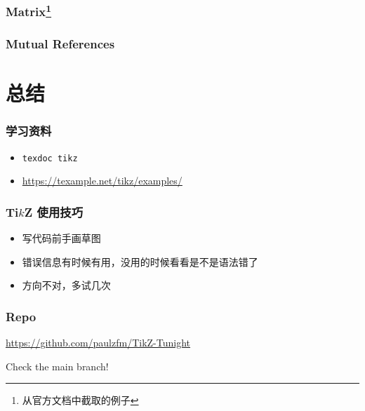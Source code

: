\documentclass[usenames,xcolor=svgnames,11pt,sans]{beamer}
\newcommand{\key}[1]{{\color{theme} #1}}
\let\t\texttt
\begin{document}
\begin{frame}
    \frametitle{Matrix\footnote{从官方文档中截取的例子}}

    \centering
\end{frame}

\begin{frame}[fragile]
    \frametitle{Mutual References}

    

    \begin{center}
    \end{center}
\end{frame}

\section{总结}

\begin{frame}
    \frametitle{学习资料}

    \begin{itemize}
        \item \t{texdoc tikz}
        \item \url{https://texample.net/tikz/examples/}
    \end{itemize}
\end{frame}

\begin{frame}
    \frametitle{Ti$k$Z 使用技巧}

    \begin{itemize}
        \item 写代码前手画草图
        \pause
        \item 错误信息有时候有用，没用的时候看看是不是语法错了
        \pause
        \item 方向不对，多试几次
    \end{itemize}
\end{frame}

\begin{frame}
    \frametitle{Repo}

    \centering\Large
    
    \url{https://github.com/paulzfm/TikZ-Tunight}

    \vspace{10pt}
    Check the \key{main} branch!
\end{frame}
\end{document}
